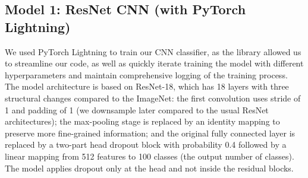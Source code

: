\documentclass[10pt]{article} %
\begin{document}
\subsection{Model 1: ResNet CNN (with PyTorch Lightning)}
We used PyTorch Lightning to train our CNN classifier, as the library allowed us to streamline our code, as well as quickly iterate training the model with different hyperparameters and maintain comprehensive logging of the training process. The model architecture is based on ResNet-18, which has 18 layers with three structural changes compared to the ImageNet: the first convolution uses stride of 1 and padding of 1 (we downsample later compared to the usual ResNet architectures); the max-pooling stage is replaced by an identity mapping to preserve more fine-grained information; and the original fully connected layer is replaced by a two-part head dropout block with probability 0.4 followed by a linear mapping from 512 features to 100 classes (the output number of classes). The model applies dropout only at the head and not inside the residual blocks.
\end{document}
